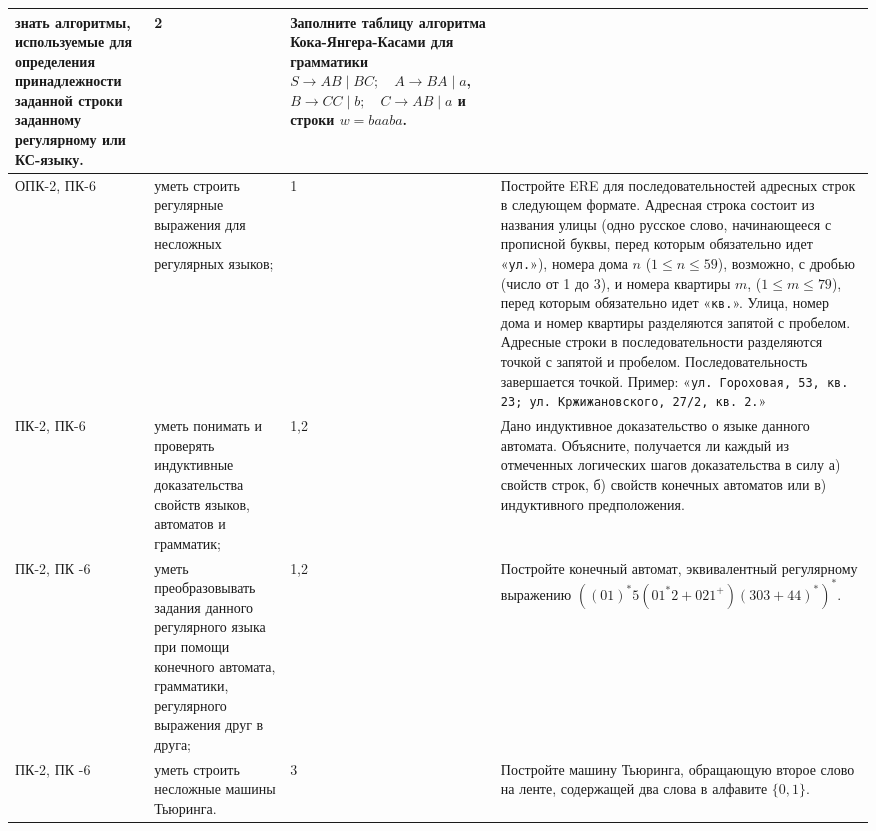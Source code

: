 \documentclass[a4paper,12pt]{article}
\begin{document}
\begin{longtable}{|p{15mm}|p{42mm}|p{17mm}|p{70mm}|}
знать алгоритмы, используемые для определения принадлежности заданной строки заданному регулярному или КС-языку. & 
2 & 
Заполните таблицу алгоритма Кока-Янгера-Касами для грамматики \newline
$S \to AB \mid BC;\quad A \to BA \mid a$,\newline
$B \to CC \mid b;\quad C \to AB \mid a$\newline
и строки $w = baaba$. 
\\
\hline
ОПК-2, ПК-6 & 
уметь строить регулярные выражения для несложных регулярных языков; & 
1 & 
Постройте ERE для последовательностей адресных строк в следующем формате.
Адресная строка состоит из названия улицы (одно русское слово, начинающееся с прописной буквы,
перед которым обязательно идет «{\tt ул.}»), номера дома $n$
(\mbox{$1 \leqslant n \leqslant 59$}), возможно, с дробью (число от 1 до 3), и номера
квартиры $m$, ($1 \leqslant m \leqslant 79$), перед которым обязательно идет
«{\tt кв.}». Улица, номер дома и номер квартиры разделяются запятой с пробелом. Адресные
строки в последовательности разделяются точкой с запятой и пробелом. Последовательность
завершается точкой. Пример:
«{\tt ул. Гороховая, 53, кв. 23; ул. Кржижановского, 27/2, кв. 2.}» 
\\
\hline
ПК-2, ПК-6 & 
уметь понимать и проверять индуктивные доказательства свойств языков, автоматов и грамматик; & 
1,2 & 
Дано индуктивное доказательство о языке данного автомата. Объясните, получается ли
каждый из отмеченных логических шагов доказательства в силу
а) свойств строк, б) свойств конечных автоматов или в) индуктивного предположения. 
\\
\hline
ПК-2, ПК -6 & 
уметь преобразовывать задания данного регулярного языка при помощи конечного автомата, грамматики, регулярного выражения друг в друга; & 
1,2 & 
Постройте конечный автомат, эквивалентный регулярному выражению $((01)^*5(01^*2 + 021^+)(303+44)^*)^*$. 
\\
\hline
ПК-2, ПК -6 & 
уметь строить несложные машины Тьюринга. & 
3 & 
Постройте машину Тьюринга, обращающую второе слово на ленте, содержащей два слова в алфавите $\{0,1\}$. 
\\
\hline
\end{longtable}
\end{document}
